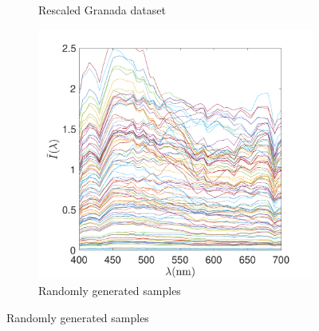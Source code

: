 \documentclass{jov}
\begin{document}
\begin{figure}
\begin{subfigure}[b]{0.3\textwidth}
        \caption{Rescaled Granada dataset}
        \label{fig:rescaledGranada}
    \end{subfigure}
    \begin{subfigure}[b]{0.3 \textwidth}
    \centering
        \includegraphics[width=\textwidth]{../Figures/Figure12/Figure12_c.pdf}
        \caption{Randomly generated samples}
        \label{fig:randomIlluminant}
    \end{subfigure}


\end{figure}
\end{document}
